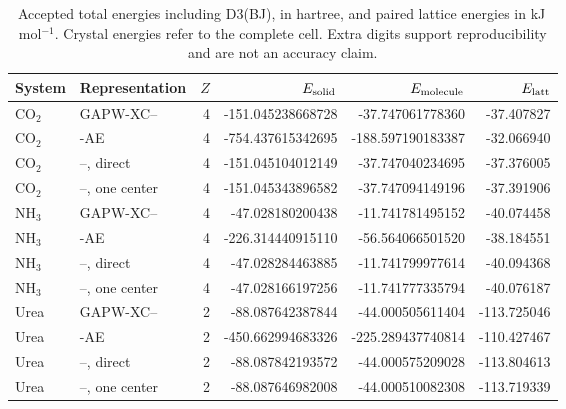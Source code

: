 \begin{table}[t]
\centering
\caption{Accepted total energies including D3(BJ), in hartree, and paired lattice energies in kJ\,mol$^{-1}$. Crystal energies refer to the complete cell. Extra digits support reproducibility and are not an accuracy claim.}
\label{tab:x23_total_si}
\begin{tabular}{llrrrr}
\toprule
System & Representation & $Z$ & $E_{\rm solid}$ & $E_{\rm molecule}$ & $E_{\rm latt}$ \\
\midrule
CO$_2$ & GAPW-XC--\GTH{} & 4 & -151.045238668728 & -37.747061778360 & -37.407827 \\
CO$_2$ & \GAPW{}-AE & 4 & -754.437615342695 & -188.597190183387 & -32.066940 \\
CO$_2$ & \GAPW{}--\GTH{}, direct & 4 & -151.045104012149 & -37.747040234695 & -37.376005 \\
CO$_2$ & \GAPW{}--\GTH{}, one center & 4 & -151.045343896582 & -37.747094149196 & -37.391906 \\
NH$_3$ & GAPW-XC--\GTH{} & 4 & -47.028180200438 & -11.741781495152 & -40.074458 \\
NH$_3$ & \GAPW{}-AE & 4 & -226.314440915110 & -56.564066501520 & -38.184551 \\
NH$_3$ & \GAPW{}--\GTH{}, direct & 4 & -47.028284463885 & -11.741799977614 & -40.094368 \\
NH$_3$ & \GAPW{}--\GTH{}, one center & 4 & -47.028166197256 & -11.741777335794 & -40.076187 \\
Urea & GAPW-XC--\GTH{} & 2 & -88.087642387844 & -44.000505611404 & -113.725046 \\
Urea & \GAPW{}-AE & 2 & -450.662994683326 & -225.289437740814 & -110.427467 \\
Urea & \GAPW{}--\GTH{}, direct & 2 & -88.087842193572 & -44.000575209028 & -113.804613 \\
Urea & \GAPW{}--\GTH{}, one center & 2 & -88.087646982008 & -44.000510082308 & -113.719339 \\
\bottomrule
\end{tabular}
\end{table}

